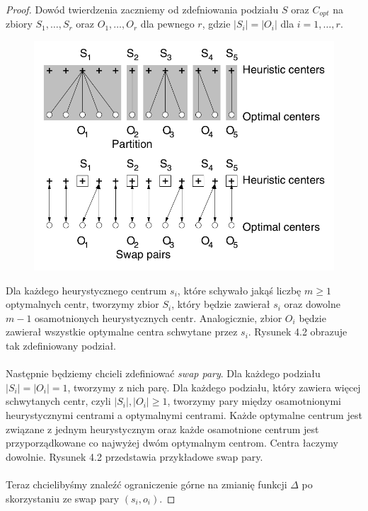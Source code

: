 \begin{proof}
    Dowód twierdzenia zaczniemy od zdefniowania podziału $S$ oraz $C_{opt}$ na zbiory $S_{1}, \dots, S_{r}$ oraz $O_{1}, \dots, O_{r}$ dla pewnego $r$, gdzie $|S_{i}| = |O_{i}|$ dla $i = 1, \dots, r$.
    \begin{figure}[H]
        \centering
        \includegraphics[totalheight=8cm]{swap.png}
        \caption{}
    \end{figure}
    Dla każdego heurystycznego centrum $s_{i}$, które schywało jakąś liczbę $m \geq 1$ optymalnych centr, tworzymy zbior $S_{i}$, który będzie zawierał $s_{i}$ oraz dowolne $m-1$ osamotnionych heurystycznych centr.
    Analogicznie, zbior $O_{i}$ będzie zawierał wszystkie optymalne centra schwytane przez $s_{i}$.
    Rysunek 4.2 obrazuje tak zdefiniowany podział.
    \\~\\
    \noindent
    Następnie będziemy chcieli zdefiniować \textit{swap pary}.
    Dla każdego podziału $|S_{i}| = |O_{i}| = 1$, tworzymy z nich parę.
    Dla każdego podziału, który zawiera więcej schwytanych centr, czyli $|S_{i}|, |O_{i}| \geq 1$, tworzymy pary między osamotnionymi heurystycznymi centrami a optymalnymi centrami.
    Każde optymalne centrum jest związane z jednym heurystycznym oraz każde osamotnione centrum jest przyporządkowane co najwyżej dwóm optymalnym centrom.
    Centra łaczymy dowolnie. 
    Rysunek 4.2 przedstawia przykładowe swap pary.
    \\~\\
    Teraz chcielibyśmy znaleźć ograniczenie górne na zmianię funkcji $\Delta$ po skorzystaniu ze swap pary $(s_{i}, o_{i})$.

\end{proof}

